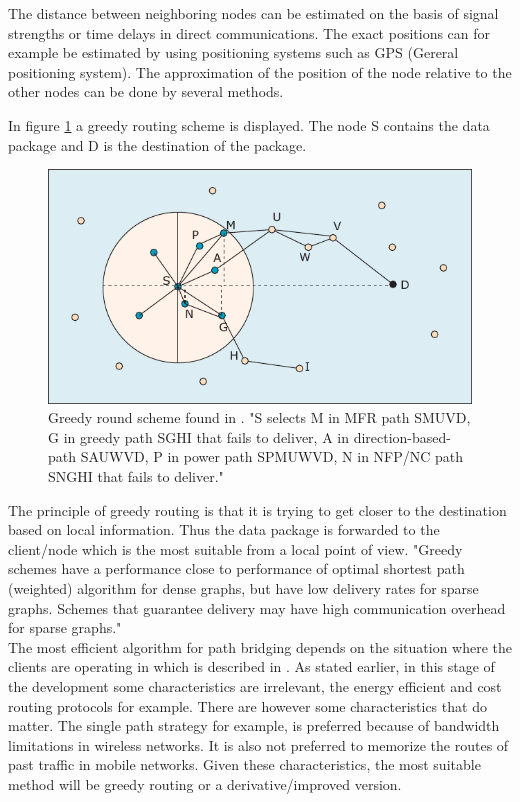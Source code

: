 \documentclass[10pt,a4paper]{article}
\begin{document}
The distance between neighboring nodes can be estimated on the basis of signal strengths or time delays in direct communications. The exact positions can for example be estimated by using positioning systems such as GPS (Gereral positioning system). \cite{locationsystemsforubiquitouscomputing} The approximation of the position of the node relative to the other nodes can be done by several methods.

In figure \ref{fig:greedyrouting} a greedy routing scheme is displayed. The node S contains the data package and D is the destination of the package. 

\begin{figure}[H]
   \centering
   \includegraphics[width=1\textwidth]{greedyrouting}
   \caption{Greedy round scheme found in \cite{position-based}. "S selects M in MFR path SMUVD, G in greedy path SGHI that
fails to deliver, A in direction-based-path SAUWVD, P in power path
SPMUWVD, N in NFP/NC path SNGHI that fails to deliver."}
   \label{fig:greedyrouting}
\end{figure}

The principle of greedy routing is that it is trying to get closer to the destination based on local information. Thus the data package is forwarded to the client/node which is the most suitable from a local point of view. \cite{geographicrouting} "Greedy schemes have a performance close to performance of optimal shortest path (weighted) algorithm for dense graphs, but have low delivery rates for sparse graphs. Schemes that guarantee delivery may have high communication overhead for sparse graphs." \cite{position-based}\cite{positionbasedroutingtaxonomy} \\

The most efficient algorithm for path bridging depends on the situation where the clients are operating in which is described in \cite{position-based}\cite{positionbasedroutingtaxonomy}. As stated earlier, in this stage of the development some characteristics are irrelevant, the energy efficient and cost routing protocols for example. There are however some characteristics that do matter. The single path strategy for example, is preferred because of bandwidth limitations in wireless networks. It is also not preferred to memorize the routes of past traffic in mobile networks.\cite{position-based} \cite{positionbasedroutingtaxonomy} Given these characteristics, the most suitable method will be greedy routing or a derivative/improved version.
\end{document}
